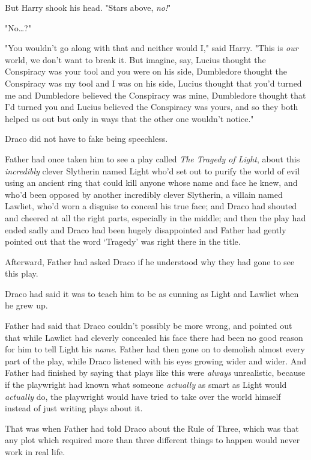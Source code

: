 But Harry shook his head. "Stars above, \emph{no!}"

"No…?"

"You wouldn't go along with that and neither would I," said Harry. "This is
\emph{our} world, we don't want to break it. But imagine, say, Lucius thought
the Conspiracy was your tool and you were on his side, Dumbledore thought the
Conspiracy was my tool and I was on his side, Lucius thought that you'd turned
me and Dumbledore believed the Conspiracy was mine, Dumbledore thought that I'd
turned you and Lucius believed the Conspiracy was yours, and so they both
helped us out but only in ways that the other one wouldn't notice."

Draco did not have to fake being speechless.

Father had once taken him to see a play called \emph{The Tragedy of Light},
about this \emph{incredibly} clever Slytherin named Light who'd set out to
purify the world of evil using an ancient ring that could kill anyone whose
name and face he knew, and who'd been opposed by another incredibly clever
Slytherin, a villain named Lawliet, who'd worn a disguise to conceal his true
face; and Draco had shouted and cheered at all the right parts, especially in
the middle; and then the play had ended sadly and Draco had been hugely
disappointed and Father had gently pointed out that the word `Tragedy' was
right there in the title.

Afterward, Father had asked Draco if he understood why they had gone to see
this play.

Draco had said it was to teach him to be as cunning as Light and Lawliet when
he grew up.

Father had said that Draco couldn't possibly be more wrong, and pointed out
that while Lawliet had cleverly concealed his face there had been no good
reason for him to tell Light his \emph{name}. Father had then gone on to
demolish almost every part of the play, while Draco listened with his eyes
growing wider and wider. And Father had finished by saying that plays like this
were \emph{always} unrealistic, because if the playwright had known what
someone \emph{actually} as smart as Light would \emph{actually} do, the
playwright would have tried to take over the world himself instead of just
writing plays about it.

That was when Father had told Draco about the Rule of Three, which was that any
plot which required more than three different things to happen would never work
in real life.

